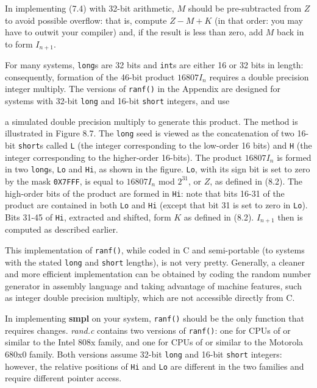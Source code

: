 In implementing (7.4) with 32-bit arithmetic, $M$ should be pre-subtracted
from $Z$ to avoid possible overflow: that is, compute $Z-M+K$ (in that order:
you may have to outwit your compiler) and, if the result is less than zero,
add $M$ back in to form $I_{n+1}$.

For many systems, \texttt{long}s are 32 bits and \texttt{int}s are either 16 or 32 bits in
length: consequently, formation of the 46-bit product $16807I_n$ requires a
double precision integer multiply. The versions of \texttt{ranf()} in the Appendix
are designed for systems with 32-bit \texttt{long} and 16-bit \texttt{short} integers, and use

\noindent a simulated double precision multiply to generate this product. The method
is illustrated in Figure 8.7. The \texttt{long} seed is viewed as the concatenation of
two 16-bit \texttt{short}s called \texttt{L} (the integer corresponding to the low-order 16
bits) and \texttt{H} (the integer corresponding to the higher-order 16-bits). The
product $16807I_n$ is formed in two \texttt{long}s, \texttt{Lo} and \texttt{Hi}, as shown in the figure.
\texttt{Lo}, with its sign bit is set to zero by the mask \texttt{0X7FFF}, is equal to $16807I_n$ mod
$2^{31}$, or $Z$, as defined in (8.2). The high-order bits of the product are formed in
\texttt{Hi}: note that bits 16-31 of the product are contained in both \texttt{Lo} and \texttt{Hi}
(except that bit 31 is set to zero in \texttt{Lo}). Bits 31-45 of \texttt{Hi}, extracted and
shifted, form $K$ as defined in (8.2). $I_{n+1}$ then is computed as described earlier.

This implementation of \texttt{ranf()}, while coded in C and semi-portable (to
systems with the stated \texttt{long} and \texttt{short} lengths), is not very pretty.
Generally, a cleaner and more efficient implementation can be obtained by
coding the random number generator in assembly language and taking
advantage of machine features, such as integer double precision multiply,
which are not accessible directly from C.

In implementing \textbf{smpl} on your system, \texttt{ranf()} should be the only function
that requires changes. \textit{rand.c} contains two versions of \texttt{ranf()}: one for CPUs
of or similar to the Intel 808x family, and one for CPUs of or similar to the
Motorola 680x0 family. Both versions assume 32-bit \texttt{long} and 16-bit \texttt{short}
integers: however, the relative positions of \texttt{Hi} and \texttt{Lo} are different in the
two families and require different pointer access.

